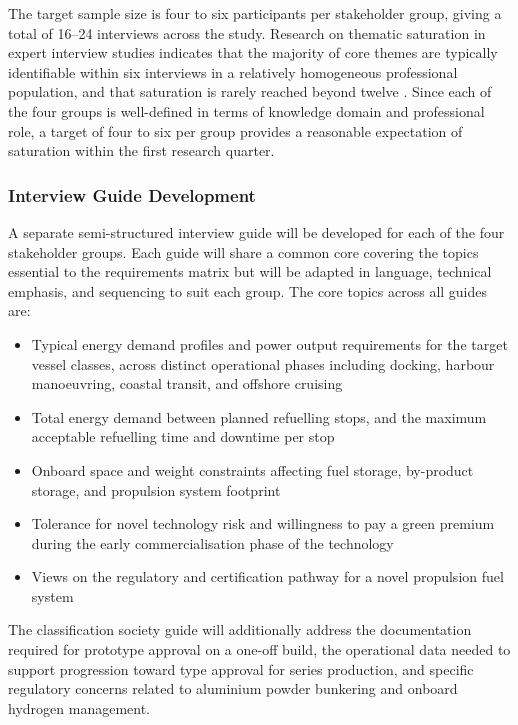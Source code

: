 \documentclass[12pt]{article}
\begin{document}
The target sample size is four to six participants per stakeholder group, giving a 
total of 16--24 interviews across the study. Research on thematic saturation in 
expert interview studies indicates that the majority of core themes are typically 
identifiable within six interviews in a relatively homogeneous professional 
population, and that saturation is rarely reached beyond twelve \cite{guest2006}. 
Since each of the four groups is well-defined in terms of knowledge domain and 
professional role, a target of four to six per group provides a reasonable 
expectation of saturation within the first research quarter.

\subsubsection*{Interview Guide Development}

A separate semi-structured interview guide will be developed for each of the four 
stakeholder groups. Each guide will share a common core covering the topics 
essential to the requirements matrix but will be adapted in language, technical 
emphasis, and sequencing to suit each group. The core topics across all guides are:

\begin{itemize}
    \item Typical energy demand profiles and power output requirements for the 
    target vessel classes, across distinct operational phases including docking, 
    harbour manoeuvring, coastal transit, and offshore cruising

    \item Total energy demand between planned refuelling stops, and the maximum 
    acceptable refuelling time and downtime per stop

    \item Onboard space and weight constraints affecting fuel storage, by-product 
    storage, and propulsion system footprint

    \item Tolerance for novel technology risk and willingness to pay a green premium 
    during the early commercialisation phase of the technology

    \item Views on the regulatory and certification pathway for a novel propulsion 
    fuel system
\end{itemize}

The classification society guide will additionally address the documentation 
required for prototype approval on a one-off build, the operational data needed to 
support progression toward type approval for series production, and specific 
regulatory concerns related to aluminium powder bunkering and onboard hydrogen 
management.
\end{document}
